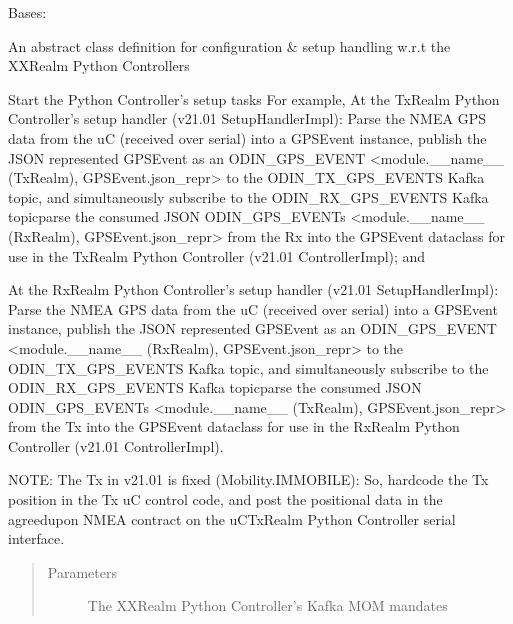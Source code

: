 \documentclass[letterpaper,10pt,english]{sphinxmanual}
\begin{document}

\begin{fulllineitems}
\label{\detokenize{Forge:Forge.SetupHandler}}
\sphinxAtStartPar
Bases: 

\sphinxAtStartPar
An abstract class definition for configuration \& setup handling w.r.t the XXRealm Python Controllers

\begin{fulllineitems}
\label{\detokenize{Forge:Forge.SetupHandler.setup}}
\sphinxAtStartPar
Start the Python Controller’s setup tasks
For example, At the TxRealm Python Controller’s setup handler (v21.01 SetupHandlerImpl): Parse the NMEA GPS
data from the uC (received over serial) into a GPSEvent instance, publish the JSON represented GPSEvent
as an ODIN\_GPS\_EVENT \textless{}module.\_\_name\_\_ (TxRealm), GPSEvent.json\_repr\textgreater{} to the ODIN\_TX\_GPS\_EVENTS Kafka
topic, and  simultaneously subscribe to the ODIN\_RX\_GPS\_EVENTS Kafka topic\textendash{}parse the consumed JSON
ODIN\_GPS\_EVENTs \textless{}module.\_\_name\_\_ (RxRealm), GPSEvent.json\_repr\textgreater{} from the Rx into the GPSEvent dataclass
for use in the TxRealm Python Controller (v21.01 ControllerImpl); and

\sphinxAtStartPar
At the RxRealm Python Controller’s setup handler (v21.01 SetupHandlerImpl): Parse the NMEA GPS
data from the uC (received over serial) into a GPSEvent instance, publish the JSON represented GPSEvent
as an ODIN\_GPS\_EVENT \textless{}module.\_\_name\_\_ (RxRealm), GPSEvent.json\_repr\textgreater{} to the ODIN\_TX\_GPS\_EVENTS Kafka
topic, and  simultaneously subscribe to the ODIN\_RX\_GPS\_EVENTS Kafka topic\textendash{}parse the consumed JSON
ODIN\_GPS\_EVENTs \textless{}module.\_\_name\_\_ (TxRealm), GPSEvent.json\_repr\textgreater{} from the Tx into the GPSEvent dataclass
for use in the RxRealm Python Controller (v21.01 ControllerImpl).

\sphinxAtStartPar
NOTE: The Tx in v21.01 is fixed (Mobility.IMMOBILE): So, hard\sphinxhyphen{}code the Tx position in the Tx uC control
code, and post the positional data in the agreed\sphinxhyphen{}upon NMEA contract on the uC\sphinxhyphen{}TxRealm Python Controller
serial interface.
\begin{quote}\begin{description}
\item[{Parameters}] \leavevmode
\sphinxAtStartPar
{} \textendash{} The XXRealm Python Controller’s Kafka MOM mandates


\end{description}
\end{quote}
\end{fulllineitems}
\end{fulllineitems}
\end{document}

